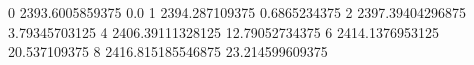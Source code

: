 0 2393.6005859375 0.0
1 2394.287109375 0.6865234375
2 2397.39404296875 3.79345703125
4 2406.39111328125 12.79052734375
6 2414.1376953125 20.537109375
8 2416.815185546875 23.214599609375
